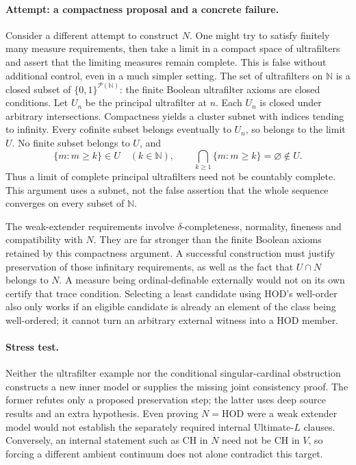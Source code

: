 \documentclass[11pt,a4paper]{article}
\numberwithin{equation}{section}
\newcommand{\N}{\mathbb{N}}
\begin{document}
\paragraph{Attempt: a compactness proposal and a concrete failure.}
Consider a different attempt to construct $N$. One might try to satisfy
finitely many measure requirements, then take a limit in a compact space
of ultrafilters and assert that the limiting measures remain complete.
This is false without additional control, even in a much simpler setting.
The set of ultrafilters on $\N$ is a closed subset of
$\{0,1\}^{\mathcal P(\N)}$: the finite Boolean ultrafilter axioms are
closed conditions. Let $U_n$ be the principal ultrafilter at $n$.
Each $U_n$ is closed under arbitrary intersections. Compactness yields a
cluster subnet with indices tending to infinity. Every cofinite subset
belongs eventually to $U_n$, so belongs to the limit $U$.
No finite subset belongs to $U$, and
\[
 \{m:m\geq k\}\in U\quad(k\in\N),
 \qquad \bigcap_{k\geq1}\{m:m\geq k\}=\varnothing\notin U.
\]
Thus a limit of complete principal ultrafilters need not be countably
complete. This argument uses a subnet, not the false assertion that the
whole sequence converges on every subset of $\N$.

The weak-extender requirements involve $\delta$-completeness, normality,
fineness and compatibility with $N$. They are far stronger than the finite
Boolean axioms retained by this compactness argument. A successful
construction must justify preservation of those infinitary requirements,
as well as the fact that $U\cap N$ belongs to $N$. A measure being
ordinal-definable externally would not on its own certify that trace
condition. Selecting a least candidate using HOD's well-order also only
works if an eligible candidate is already an element of the class being
well-ordered; it cannot turn an arbitrary external witness into a HOD
member.

\paragraph{Stress test.}
Neither the ultrafilter example nor the conditional singular-cardinal
obstruction constructs a new inner model or supplies the missing joint
consistency proof. The former refutes only a proposed preservation step;
the latter uses deep source results and an extra hypothesis. Even proving
$N=\mathrm{HOD}$ were a weak extender model would not establish the
separately required internal Ultimate-$L$ clauses. Conversely, an internal
statement such as CH in $N$ need not be CH in $V$, so forcing a different
ambient continuum does not alone contradict this target.
\end{document}
